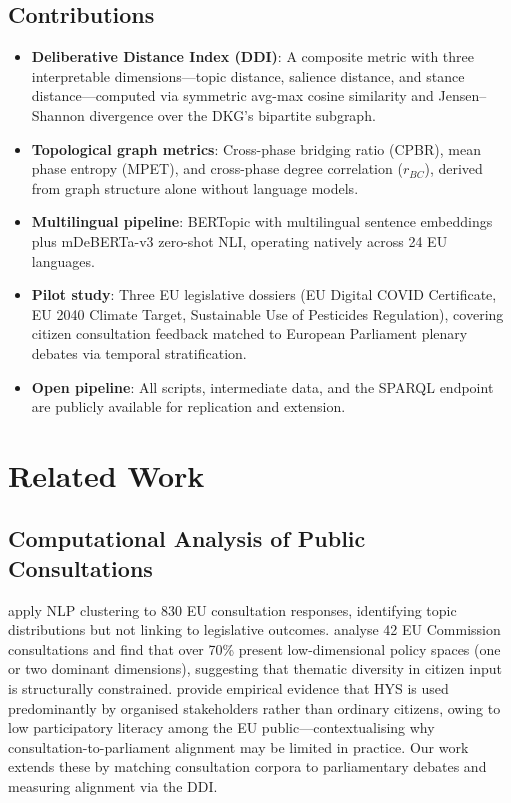 \documentclass[sigconf,natbib]{acmart}
\begin{document}
\subsection{Contributions}
\begin{itemize}
  \item[\textbf{C1}] \textbf{Deliberative Distance Index (DDI)}: A composite metric with three interpretable dimensions---topic distance, salience distance, and stance distance---computed via symmetric avg-max cosine similarity and Jensen--Shannon divergence over the DKG's bipartite subgraph.
  \item[\textbf{C2}] \textbf{Topological graph metrics}: Cross-phase bridging ratio (CPBR), mean phase entropy (MPET), and cross-phase degree correlation ($r_{BC}$), derived from graph structure alone without language models.
  \item[\textbf{C3}] \textbf{Multilingual pipeline}: BERTopic with multilingual sentence embeddings plus mDeBERTa-v3 zero-shot NLI, operating natively across 24 EU languages.
  \item[\textbf{C4}] \textbf{Pilot study}: Three EU legislative dossiers (EU Digital COVID Certificate, EU 2040 Climate Target, Sustainable Use of Pesticides Regulation), covering citizen consultation feedback matched to European Parliament plenary debates via temporal stratification.
  \item[\textbf{C5}] \textbf{Open pipeline}: All scripts, intermediate data, and the SPARQL endpoint are publicly available for replication and extension.
\end{itemize}

\section{Related Work}

\subsection{Computational Analysis of Public Consultations}
\citet{DiPorto2024} apply NLP clustering to 830 EU consultation responses, identifying topic distributions but not linking to legislative outcomes.
\citet{Bunea2024} analyse 42 EU Commission consultations and find that over 70\% present low-dimensional policy spaces (one or two dominant dimensions), suggesting that thematic diversity in citizen input is structurally constrained.
\citet{Neumann2025} provide empirical evidence that HYS is used predominantly by organised stakeholders rather than ordinary citizens, owing to low participatory literacy among the EU public---contextualising why consultation-to-parliament alignment may be limited in practice.
Our work extends these by matching consultation corpora to parliamentary debates and measuring alignment via the DDI.
\end{document}
